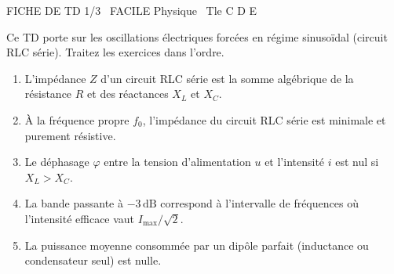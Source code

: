 \documentclass[11pt]{article}
\begin{document}
\begin{tcolorbox}[enhanced,colback=popink,colframe=popink,arc=10pt,boxrule=0pt,left=12pt,right=12pt,top=9pt,bottom=9pt]
{\color{white}\popxbold\small FICHE DE TD 1/3 \textbullet\ FACILE \hfill Physique \textbullet\ Tle C D E\par}
\end{tcolorbox}
\vspace{4pt}
Ce TD porte sur les oscillations électriques forcées en régime sinusoïdal (circuit RLC série). Traitez les exercices dans l'ordre.

\begin{exercice}
\begin{enumerate}
    \item L'impédance $Z$ d'un circuit RLC série est la somme algébrique de la résistance $R$ et des réactances $X_L$ et $X_C$.
    \item À la fréquence propre $f_0$, l'impédance du circuit RLC série est minimale et purement résistive.
    \item Le déphasage $\varphi$ entre la tension d'alimentation $u$ et l'intensité $i$ est nul si $X_L > X_C$.
    \item La bande passante à $-3\,\text{dB}$ correspond à l'intervalle de fréquences où l'intensité efficace vaut $I_{\text{max}}/\sqrt{2}$.
    \item La puissance moyenne consommée par un dipôle parfait (inductance ou condensateur seul) est nulle.
\end{enumerate}
\end{exercice}
\end{document}
